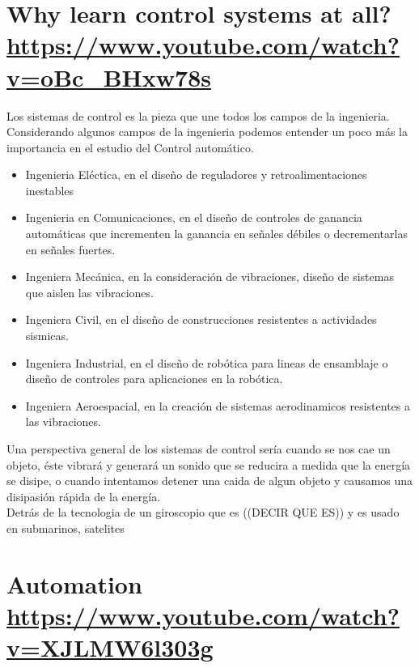 \documentclass[
	12pt, %
]{fphw}
\begin{document}
\newpage
\section*{{\color{Apricot}Why learn control systems at all?} \url{https://www.youtube.com/watch?v=oBc_BHxw78s}}

Los sistemas de control es la pieza que une todos los campos de la ingenieria.\\

Considerando algunos campos de la ingenieria podemos entender un poco más la importancia en el estudio del Control automático.

\begin{itemize}
\item Ingenieria Eléctica, en el diseño de reguladores y retroalimentaciones inestables
\item Ingenieria en Comunicaciones, en el diseño de controles de ganancia automáticas que incrementen la ganancia en señales débiles o decrementarlas en señales fuertes.
\item Ingeniera Mecánica, en la consideración de vibraciones, diseño de sistemas que aislen las vibraciones. 
\item Ingeniera Civil, en el diseño de construcciones resistentes a actividades sismicas.
\item Ingeniera Industrial, en el diseño de robótica para lineas de ensamblaje o diseño de controles para aplicaciones en la robótica.
\item Ingeniera Aeroespacial, en la creación de sistemas aerodinamicos resistentes a las vibraciones.
\end{itemize}

Una perspectiva general de los sistemas de control sería cuando se nos cae un objeto, éste vibrará y generará un sonido que se reducira a medida que la energía se disipe, o cuando intentamos detener una caida de algun objeto y causamos una disipasión rápida de la energía. \\

Detrás de la tecnologia de un giroscopio que es ((DECIR QUE ES)) y es usado en submarinos, satelites 

\newpage
\section*{{\color{Cerulean} Automation} \url{https://www.youtube.com/watch?v=XJLMW6l303g}}
\end{document}
